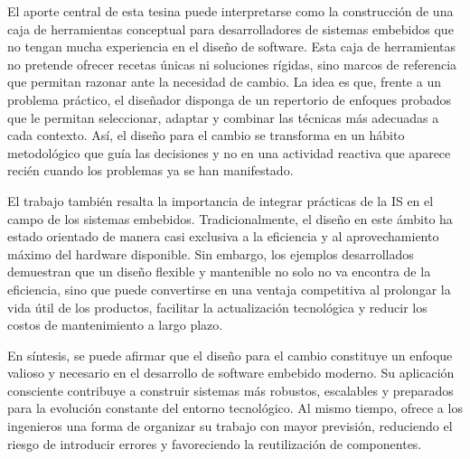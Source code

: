 El aporte central de esta tesina puede interpretarse como la construcción de una caja de herramientas conceptual para desarrolladores de sistemas embebidos que no tengan mucha experiencia en el diseño de software. Esta caja de herramientas no pretende ofrecer recetas únicas ni soluciones rígidas, sino marcos de referencia que permitan razonar ante la necesidad de cambio. La idea es que, frente a un problema práctico, el diseñador disponga de un repertorio de enfoques probados que le permitan seleccionar, adaptar y combinar las técnicas más adecuadas a cada contexto. Así, el diseño para el cambio se transforma en un hábito metodológico que guía las decisiones y no en una actividad reactiva que aparece recién cuando los problemas ya se han manifestado.

El trabajo también resalta la importancia de integrar prácticas de la \gls{IS} en el campo de los sistemas embebidos. Tradicionalmente, el diseño en este ámbito ha estado orientado de manera casi exclusiva a la eficiencia y al aprovechamiento máximo del hardware disponible. Sin embargo, los ejemplos desarrollados demuestran que un diseño flexible y mantenible no solo no va encontra de la eficiencia, sino que puede convertirse en una ventaja competitiva al prolongar la vida útil de los productos, facilitar la actualización tecnológica y reducir los costos de mantenimiento a largo plazo.

En síntesis, se puede afirmar que el diseño para el cambio constituye un enfoque valioso y necesario en el desarrollo de software embebido moderno. Su aplicación consciente contribuye a construir sistemas más robustos, escalables y preparados para la evolución constante del entorno tecnológico. Al mismo tiempo, ofrece a los ingenieros una forma de organizar su trabajo con mayor previsión, reduciendo el riesgo de introducir errores y favoreciendo la reutilización de componentes.
